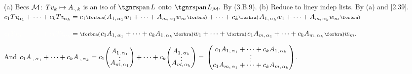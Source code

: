 (a) Becs $\mathcal{M}\!:\,Tv_k\mapsto A_{\cdot,\;\!k}$ is an iso of $\spn L$ onto $\spn L_{\mM}.$ By (3.B.9).\parSol{}
(b) Reduce to liney indep lists. By (a) and [2.39].\PfEnd\vspace{4pt}\quad
\Or\;$c_1Tv_{\:\!\!\alpha_1}+\dots+c_kTv_{\:\!\!\alpha_k}=c_1\BigPar{A_{1,\,{\alpha_1}}w_1+\dots+A_{m,\,{\alpha_1}}w_m}+\dots+c_k\BigPar{A_{1,\,{\alpha_k}}w_1+\dots+A_{m,\,{\alpha_k}}w_m}$\par\vspace{2pt}\quad
\Blind{\Or\;}$\Blind{c_1Tv_{\:\!\!\alpha_1}+\dots+c_kTv_{\:\!\!\alpha_k}}=\BigPar{c_1A_{1,\,{\alpha_1}}+\dots+c_kA_{1,\,{\alpha_k}}}w_1+\dots+\BigPar{c_1A_{m,\,{\alpha_1}}+\dots+c_kA_{m,\,{\alpha_k}}}w_m.$\par\vspace{4pt}\quad
\Blind{\Or\;}And \;$c_1A_{\cdot,\,{\alpha_1}}+\dots+c_kA_{\cdot,\,{\alpha_k}}=c_1{\normalsize\begin{pmatrix}A_{1,\,{\alpha_1}}\\[-4pt]\vdots\\[-10pt]A_{m,\,{\alpha_1}}\end{pmatrix}}+\dots+c_k{\normalsize\begin{pmatrix}A_{1,\,{\alpha_k}}\\[-4pt]\vdots\\[-10pt]A_{m,\,{\alpha_k}}\end{pmatrix}}{}={}\normalsize\begin{pmatrix}c_1 A_{1,\,{\alpha_1}}+\dots+c_kA_{1,\,{\alpha_k}}\\[-4pt]\vdots\\[-4pt]c_1A_{m,\,{\alpha_1}}+\dots+c_kA_{m,\,{\alpha_k}}\end{pmatrix}$.
\pagebreak\par\vspace{6pt}\quad
